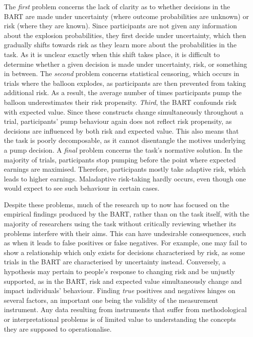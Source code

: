 \documentclass[serif, twocolumn, review]{jote-article}
\begin{document}
 The \textit{first} problem concerns the lack of clarity as to whether decisions in the BART are made under uncertainty (where outcome probabilities are unknown) or risk (where they are known). Since participants are not given any information about the explosion probabilities, they first decide under uncertainty, which then gradually shifts towards risk as they learn more about the probabilities in the task. As it is unclear exactly when this shift takes place, it is difficult to determine whether a given decision is made under uncertainty, risk, or something in between. The \textit{second} problem concerns statistical censoring, which occurs in trials where the balloon explodes, as participants are then prevented from taking additional risk. As a result, the average number of times participants pump the balloon underestimates their risk propensity. \textit{Third}, the BART confounds risk with expected value. Since these constructs change simultaneously throughout a trial, participants' pump behaviour again does not reflect risk propensity, as decisions are influenced by both risk and expected value. This also means that the task is poorly decomposable, as it cannot disentangle the motives underlying a pump decision. A \textit{final} problem concerns the task's normative solution. In the majority of trials, participants stop pumping before the point where expected earnings are maximised. Therefore, participants mostly take adaptive risk, which leads to higher earnings. Maladaptive risk-taking hardly occurs, even though one would expect to see such behaviour in certain cases.

Despite these problems, much of the research up to now has focused on the empirical findings produced by the BART, rather than on the task itself, with the majority of researchers using the task without critically reviewing whether its problems interfere with their aims. This can have undesirable consequences, such as when it leads to false positives or false negatives. For example, one may fail to show a relationship which only exists for decisions characterised by risk, as some trials in the BART are characterised by uncertainty instead. Conversely, a hypothesis may pertain to people's response to changing risk and be unjustly supported, as in the BART, risk and expected value simultaneously change and impact individuals' behaviour. Finding \textit{true} positives and negatives hinges on several factors, an important one being the validity of the measurement instrument. Any data resulting from instruments that suffer from methodological or interpretational problems is of limited value to understanding the concepts they are supposed to operationalise.
\end{document}
